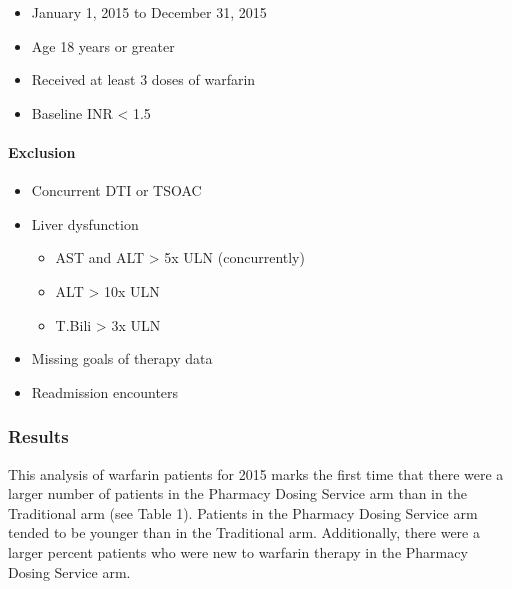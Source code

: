 \documentclass[]{article}
\providecommand{\tightlist}{%
  \setlength{\itemsep}{0pt}\setlength{\parskip}{0pt}}
\let\oldparagraph\paragraph
\renewcommand{\paragraph}[1]{\oldparagraph{#1}\mbox{}}
\begin{document}
\begin{itemize}
\tightlist
\item
  January 1, 2015 to December 31, 2015
\item
  Age 18 years or greater
\item
  Received at least 3 doses of warfarin
\item
  Baseline INR \textless{} 1.5
\end{itemize}

\paragraph{Exclusion}\label{exclusion}

\begin{itemize}
\tightlist
\item
  Concurrent DTI or TSOAC
\item
  Liver dysfunction

  \begin{itemize}
  \tightlist
  \item
    AST and ALT \textgreater{} 5x ULN (concurrently)
  \item
    ALT \textgreater{} 10x ULN
  \item
    T.Bili \textgreater{} 3x ULN
  \end{itemize}
\item
  Missing goals of therapy data
\item
  Readmission encounters
\end{itemize}

\subsubsection{Results}\label{results}

This analysis of warfarin patients for 2015 marks the first time that
there were a larger number of patients in the Pharmacy Dosing Service
arm than in the Traditional arm (see Table 1). Patients in the Pharmacy
Dosing Service arm tended to be younger than in the Traditional arm.
Additionally, there were a larger percent patients who were new to
warfarin therapy in the Pharmacy Dosing Service arm.
\end{document}
